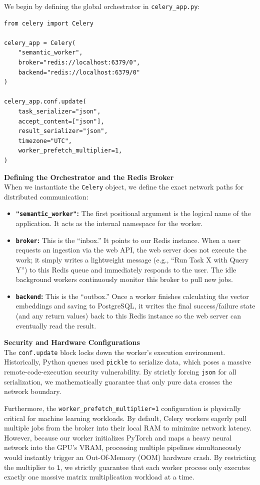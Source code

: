 We begin by defining the global orchestrator in \texttt{celery\_app.py}:

\begin{lstlisting}[caption={The Celery Application Orchestrator}]
from celery import Celery

celery_app = Celery(
    "semantic_worker",
    broker="redis://localhost:6379/0",
    backend="redis://localhost:6379/0"
)

celery_app.conf.update(
    task_serializer="json",
    accept_content=["json"],
    result_serializer="json",
    timezone="UTC",
    worker_prefetch_multiplier=1,
)
\end{lstlisting}

\textbf{Defining the Orchestrator and the Redis Broker} \\
When we instantiate the \texttt{Celery} object, we define the exact network paths for distributed communication:
\begin{itemize}
    \item \textbf{\texttt{"semantic\_worker"}:} The first positional argument is the logical name of the application. It acts as the internal namespace for the worker.
    \item \textbf{\texttt{broker}:} This is the ``inbox.'' It points to our Redis instance. When a user requests an ingestion via the web API, the web server does not execute the work; it simply writes a lightweight message (e.g., ``Run Task X with Query Y'') to this Redis queue and immediately responds to the user. The idle background workers continuously monitor this broker to pull new jobs.
    \item \textbf{\texttt{backend}:} This is the ``outbox.'' Once a worker finishes calculating the vector embeddings and saving to PostgreSQL, it writes the final success/failure state (and any return values) back to this Redis instance so the web server can eventually read the result.
\end{itemize}

\textbf{Security and Hardware Configurations} \\
The \texttt{conf.update} block locks down the worker's execution environment. Historically, Python queues used \texttt{pickle} to serialize data, which poses a massive remote-code-execution security vulnerability. By strictly forcing \texttt{json} for all serialization, we mathematically guarantee that only pure data crosses the network boundary.

Furthermore, the \texttt{worker\_prefetch\_multiplier=1} configuration is physically critical for machine learning workloads. By default, Celery workers eagerly pull multiple jobs from the broker into their local RAM to minimize network latency. However, because our worker initializes PyTorch and maps a heavy neural network into the GPU's VRAM, processing multiple pipelines simultaneously would instantly trigger an Out-Of-Memory (OOM) hardware crash. By restricting the multiplier to \texttt{1}, we strictly guarantee that each worker process only executes exactly one massive matrix multiplication workload at a time.


